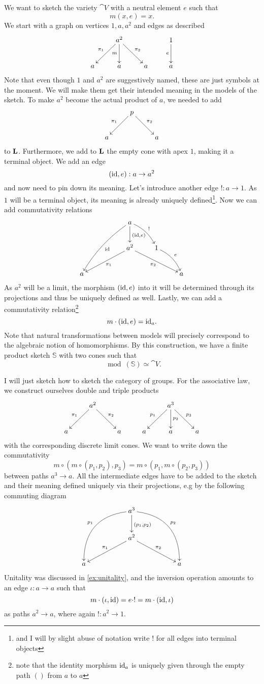 \begin{Example}\label{ex:unitality}
We want to sketch the variety $\cat V$ with a neutral element $e$ such that
\[ m(x, e) = x. \]
We start with a graph on vertices $1, a, a^2$ and edges as described
\[
\xymatrix{
  & a^2 \ar[rd]^{\pi_2} \ar[d]_{m} \ar[ld]_{\pi_1} & & 1 \ar[d]_{e} \\
a & a & a & a
}\]
Note that even though $1$ and $a^2$ are suggestively named, these are just symbols at the moment. We will make them get their intended meaning in the models of the sketch. To make $a^2$ become the actual product of $a$, we needed to add
\[
\xymatrix{
  & p \ar[rd]^{\pi_2} \ar[ld]_{\pi_1} & \\
a & & a
}\]
to $\textbf{L}$. Furthermore, we add to $\textbf{L}$ the empty cone with apex $1$, making it a terminal object. We add an edge
\[ (\textrm{id},e) : a \to a^2 \]
and now need to pin down its meaning. Let's introduce another edge $! : a \to 1$. As $1$ will be a terminal object, its meaning is already uniquely defined\footnote{and I will by slight abuse of notation write $!$ for all edges into terminal objects}. Now we can add commutativity relations
\[
\xymatrix{
  & & a \ar[d]^{(\id,e)} \ar@/_/[lldd]^{\id} \ar@/^/[rd]^{!}  & & \\
  & & a^2 \ar[lld]^{\pi_1} \ar[rrd]_{\pi_2} & 1 \ar@/^/[rd]^{e} & \\
a & & & & a
}\]
As $a^2$ will be a limit, the morphism $(\textrm{id},e)$ into it will be determined through its projections and thus be uniquely defined as well. Lastly, we can add a commutativity relation\footnote{note that the identity morphism $\textrm{id}_a$ is uniquely given through the empty path $()$ from $a$ to $a$}
\[ m \cdot (\textrm{id},e) = \textrm{id}_a. \]
Note that natural transformations between models will precisely correspond to the algebraic notion of homomorphisms. By this construction, we have a finite product sketch $\mathbb S$ with two cones such that
\[ \mod(\mathbb S) \simeq \cat V. \]
\end{Example}

\begin{Example}[Groups]
I will just sketch how to sketch the category of groups. For the associative law, we construct ourselves double and triple products
\[
\xymatrix{
  & a^2 \ar[ld]_{\pi_1} \ar[rd]^{\pi_2} &    & & a^3 \ar[ld]_{p_1} \ar[d]^{p_2} \ar[rd]^{p_3} & \\
a &     & a & a & a & a
}\]
with the corresponding discrete limit cones. We want to write down the commutativity
\[ m \circ (m \circ (p_1, p_2), p_3) = m \circ (p_1, m \circ (p_2,p_3)) \]
between paths $a^3 \to a$. All the intermediate edges have to be added to the sketch and their meaning defined uniquely via their projections, e.g by the following commuting diagram
\[
\xymatrix{
& & a^3 \ar[d]^{(p_1,p_2)} \ar@/_2pc/[lldd]_{p_1} \ar@/^2pc/[rrdd]^{p_2} & \\
& & a^2 \ar[lld]_{\pi_1} \ar[rrd]^{\pi_2} & \\
a & & & & a
}\]
Unitality was discussed in \ref{ex:unitality}, and the inversion operation amounts to an edge $\iota : a \to a$ such that \[ m \cdot (\iota, \textrm{id}) = e \cdot ! = m \cdot (\textrm{id}, \iota) \]
as paths $a^2 \to a$, where again $!: a^2 \to 1$. 
\end{Example}

